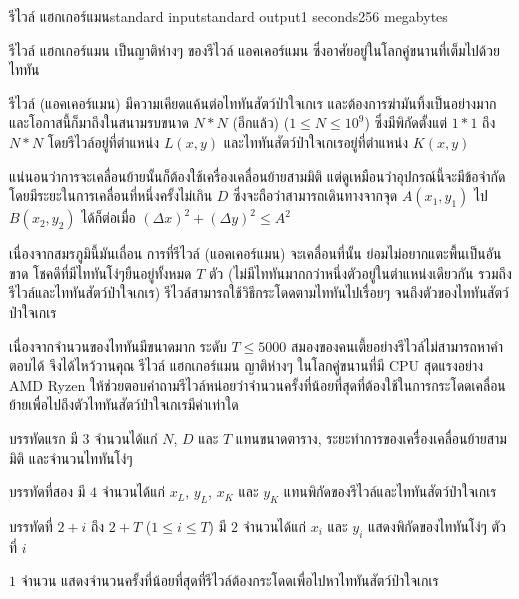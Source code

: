 \documentclass[11pt,a4paper]{article}
\begin{document}
\begin{problem}{รีไวล์ แฮกเกอร์แมน}{standard input}{standard output}{1 seconds}{256 megabytes}

รีไวล์ แฮกเกอร์แมน เป็นญาติห่างๆ ของรีไวล์ แอคเคอร์แมน ซึ่งอาศัยอยู่ในโลกคู่ขนานที่เต็มไปด้วยไททัน

รีไวล์ (แอคเคอร์แมน) มีความเคียดแค้นต่อไททันสัตว์ป่าใจเกเร และต้องการฆ่ามันทิ้งเป็นอย่างมาก และโอกาสนี้ก็มาถึงในสนามรบขนาด $N * N$ (อีกแล้ว) ($1\le N\le 10^9$) ซึ่งมีพิกัดตั้งแต่ $1*1$ ถึง $N*N$ โดยรีไวล์อยู่ที่ตำแหน่ง $L(x,y)$ และไททันสัตว์ป่าใจเกเรอยู่ที่ตำแหน่ง $K(x,y)$

แน่นอนว่าการจะเคลื่อนย้ายนั้นก็ต้องใช้เครื่องเคลื่อนย้ายสามมิติ แต่ดูเหมือนว่าอุปกรณ์นี้จะมีข้อจำกัด โดยมีระยะในการเคลื่อนที่หนึ่งครั้งไม่เกิน $D$ ซึ่งจะถือว่าสามารถเดินทางจากจุด $A(x_1,y_1)$ ไป $B(x_2,y_2)$ ได้ก็ต่อเมื่อ $(\Delta x)^2 + (\Delta y)^2 \le A^2$

เนื่องจากสมรภูมินี้มันเถื่อน การที่รีไวล์ (แอคเคอร์แมน) จะเคลื่อนที่นั้น ย่อมไม่อยากแตะพื้นเป็นอันขาด โชคดีที่มีไททันโง่ๆยืนอยู่ทั้งหมด $T$ ตัว (ไม่มีไททันมากกว่าหนึ่งตัวอยู่ในตำแหน่งเดียวกัน รวมถึงรีไวล์และไททันสัตว์ป่าใจเกเร) รีไวล์สามารถใช้วิธีกระโดดตามไททันไปเรื่อยๆ จนถึงตัวของไททันสัตว์ป่าใจเกเร

เนื่องจากจำนวนของไททันมีขนาดมาก ระดับ $T \le 5000$ สมองของคนเตี้ยอย่างรีไวล์ไม่สามารถหาคำตอบได้ จึงได้ไหว้วานคุณ รีไวล์ แฮกเกอร์แมน ญาติห่างๆ ในโลกคู่ขนานที่มี CPU สุดแรงอย่าง AMD Ryzen ให้ช่วยตอบคำถามรีไวล์หน่อยว่าจำนวนครั้งที่น้อยที่สุดที่ต้องใช้ในการกระโดดเคลื่อนย้ายเพื่อไปถึงตัวไททันสัตว์ป่าใจเกเรมีค่าเท่าใด

\InputFile

บรรทัดแรก มี $3$ จำนวนได้แก่ $N$, $D$ และ $T$ แทนขนาดตาราง, ระยะทำการของเครื่องเคลื่อนย้ายสามมิติ และจำนวนไททันโง่ๆ

บรรทัดที่สอง มี $4$ จำนวนได้แก่ $x_L$, $y_L$, $x_K$ และ $y_K$ แทนพิกัดของรีไวล์และไททันสัตว์ป่าใจเกเร

บรรทัดที่ $2+i$ ถึง $2+T$ ($1\le i\le T$) มี $2$ จำนวนได้แก่ $x_i$ และ $y_i$ แสดงพิกัดของไททันโง่ๆ ตัวที่ $i$

\OutputFile

$1$ จำนวน แสดงจำนวนครั้งที่น้อยที่สุดที่รีไวล์ต้องกระโดดเพื่อไปหาไททันสัตว์ป่าใจเกเร

\end{problem}
\end{document}
